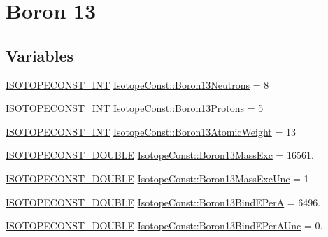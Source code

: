\hypertarget{group___isotope_const-_boron-_b13}{}\section{Boron 13}
\label{group___isotope_const-_boron-_b13}
\subsection*{Variables}
\begin{DoxyCompactItemize}
\item 
\mbox{\hyperlink{group___isotope_const-_macros_ga5f18360b3e99483a35c32d789e62621c}{I\+S\+O\+T\+O\+P\+E\+C\+O\+N\+S\+T\+\_\+\+I\+NT}} \mbox{\hyperlink{group___isotope_const-_boron-_b13_ga3755d87f661cf6c16f80929bd74b324b}{Isotope\+Const\+::\+Boron13\+Neutrons}} = 8
\item 
\mbox{\hyperlink{group___isotope_const-_macros_ga5f18360b3e99483a35c32d789e62621c}{I\+S\+O\+T\+O\+P\+E\+C\+O\+N\+S\+T\+\_\+\+I\+NT}} \mbox{\hyperlink{group___isotope_const-_boron-_b13_ga075e7bc204c94831542be16998548556}{Isotope\+Const\+::\+Boron13\+Protons}} = 5
\item 
\mbox{\hyperlink{group___isotope_const-_macros_ga5f18360b3e99483a35c32d789e62621c}{I\+S\+O\+T\+O\+P\+E\+C\+O\+N\+S\+T\+\_\+\+I\+NT}} \mbox{\hyperlink{group___isotope_const-_boron-_b13_ga3c0aebde12556a0dc8f79063ac779b00}{Isotope\+Const\+::\+Boron13\+Atomic\+Weight}} = 13
\item 
\mbox{\hyperlink{group___isotope_const-_macros_ga8f45a7272ce02c0b4c65c44636ed719a}{I\+S\+O\+T\+O\+P\+E\+C\+O\+N\+S\+T\+\_\+\+D\+O\+U\+B\+LE}} \mbox{\hyperlink{group___isotope_const-_boron-_b13_ga73261d95ebc1c108a05a1ec40f1dafdc}{Isotope\+Const\+::\+Boron13\+Mass\+Exc}} = 16561.
\item 
\mbox{\hyperlink{group___isotope_const-_macros_ga8f45a7272ce02c0b4c65c44636ed719a}{I\+S\+O\+T\+O\+P\+E\+C\+O\+N\+S\+T\+\_\+\+D\+O\+U\+B\+LE}} \mbox{\hyperlink{group___isotope_const-_boron-_b13_ga5bbd8bf54c40aac2faa279ceb876c160}{Isotope\+Const\+::\+Boron13\+Mass\+Exc\+Unc}} = 1
\item 
\mbox{\hyperlink{group___isotope_const-_macros_ga8f45a7272ce02c0b4c65c44636ed719a}{I\+S\+O\+T\+O\+P\+E\+C\+O\+N\+S\+T\+\_\+\+D\+O\+U\+B\+LE}} \mbox{\hyperlink{group___isotope_const-_boron-_b13_ga98897413abae02d8449a367c334d9f47}{Isotope\+Const\+::\+Boron13\+Bind\+E\+PerA}} = 6496.
\item 
\mbox{\hyperlink{group___isotope_const-_macros_ga8f45a7272ce02c0b4c65c44636ed719a}{I\+S\+O\+T\+O\+P\+E\+C\+O\+N\+S\+T\+\_\+\+D\+O\+U\+B\+LE}} \mbox{\hyperlink{group___isotope_const-_boron-_b13_ga678c36464256149871e3279f53a5a371}{Isotope\+Const\+::\+Boron13\+Bind\+E\+Per\+A\+Unc}} = 0.

\end{DoxyCompactItemize}
